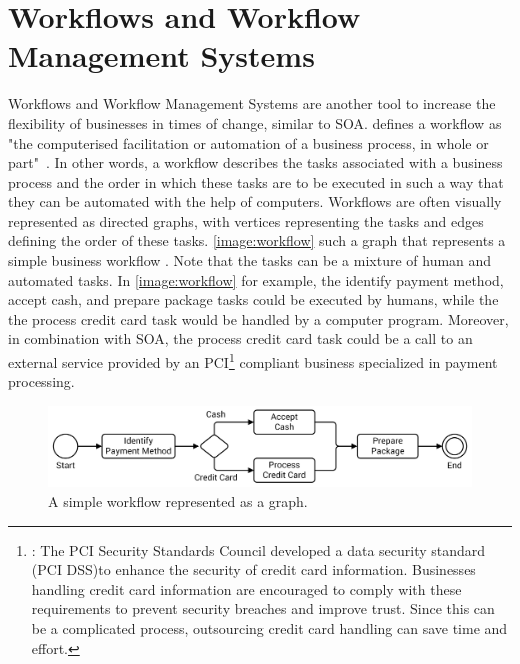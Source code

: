 \section{Workflows and Workflow Management Systems}

Workflows and Workflow Management Systems are another tool to increase the flexibility of businesses in times of change, similar to SOA.
\citeauthor*{workflow:referencemodel} defines a workflow as "the computerised facilitation or automation of a business process, in whole or part"~\autocite{workflow:referencemodel}.
In other words, a workflow describes the tasks associated with a business process and the order in which these tasks are to be executed in such a way that they can be automated with the help of computers.
Workflows are often visually represented as directed graphs, with vertices representing the tasks and edges defining the order of these tasks.
\autoref{image:workflow} such a graph that represents a simple business workflow .
Note that the tasks can be a mixture of human and automated tasks.
In \autoref{image:workflow} for example, the identify payment method, accept cash, and prepare package tasks could be executed by humans, while the the process credit card task would be handled by a computer program.
Moreover, in combination with SOA, the process credit card task could be a call to an external service provided by an PCI\footnote{: The PCI Security Standards Council developed a data security standard (PCI DSS)\footnotemark to enhance the security of credit card information. Businesses handling credit card information are encouraged to comply with these requirements to prevent security breaches and improve trust. Since this can be a complicated process, outsourcing credit card handling can save time and effort.} compliant business specialized in payment processing.


\begin{figure}[!htbp]
	\centering
	\includegraphics[resolution=600]{fundamentals/assets/workflow}
	\caption{A simple workflow represented as a graph.}
	\label{image:workflow}
\end{figure}

